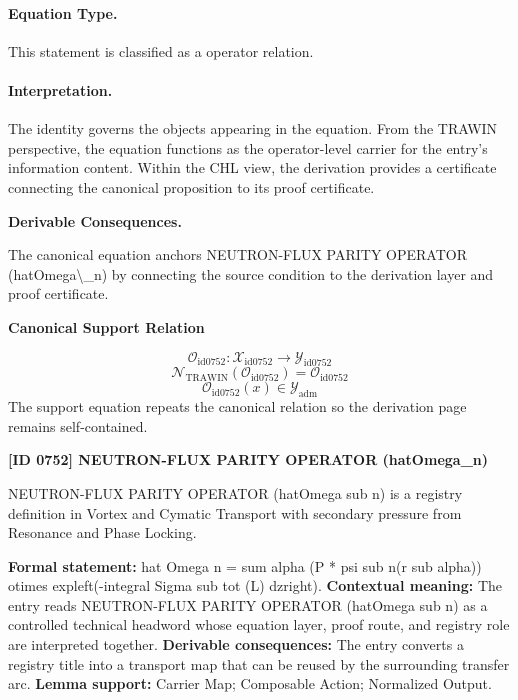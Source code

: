 \paragraph{Equation Type.}
This statement is classified as a operator relation.

\paragraph{Interpretation.}
The identity governs the objects appearing in the equation. From the TRAWIN perspective, the equation functions as the operator-level carrier for the entry’s information content. Within the CHL view, the derivation provides a certificate connecting the canonical proposition to its proof certificate.

\par\vspace{0.35em}
\noindent\textbf{Derivable Consequences.}\quad
\begingroup
\footnotesize
\raggedright
The canonical equation anchors NEUTRON-FLUX PARITY OPERATOR (hatOmega\textbackslash{}\_n) by connecting the source condition to the derivation layer and proof certificate.
\par\endgroup

\noindent\textbf{Canonical Support Relation}\par
\[
\mathcal{O}_{\mathrm{id0752}}:\mathcal{X}_{\mathrm{id0752}}\longrightarrow\mathcal{Y}_{\mathrm{id0752}}
\]
\[
\mathcal{N}_{\mathrm{TRAWIN}}(\mathcal{O}_{\mathrm{id0752}})=\mathcal{O}_{\mathrm{id0752}}
\]
\[
\mathcal{O}_{\mathrm{id0752}}(x)\in\mathcal{Y}_{\mathrm{adm}}
\]
\noindent The support equation repeats the canonical relation so the derivation page remains self-contained.\par

\clearpage
\noindent\textbf{[ID 0752] NEUTRON-FLUX PARITY OPERATOR (hatOmega\_n)}\par
\vspace{0.35em}
\begingroup\small
{}
NEUTRON-FLUX PARITY OPERATOR (hatOmega sub n) is a registry definition in Vortex and Cymatic Transport with secondary pressure from Resonance and Phase Locking.

\begingroup\footnotesize\setlength{\emergencystretch}{3em}\sloppy
\textbf{Formal statement:} hat Omega n = sum alpha (P * psi sub n(r sub alpha)) otimes expleft(-integral Sigma sub tot (L) dzright). \textbf{Contextual meaning:} The entry reads NEUTRON-FLUX PARITY OPERATOR (hatOmega sub n) as a controlled technical headword whose equation layer, proof route, and registry role are interpreted together. \textbf{Derivable consequences:} The entry converts a registry title into a transport map that can be reused by the surrounding transfer arc. \textbf{Lemma support:} Carrier Map; Composable Action; Normalized Output.\par
\endgroup

